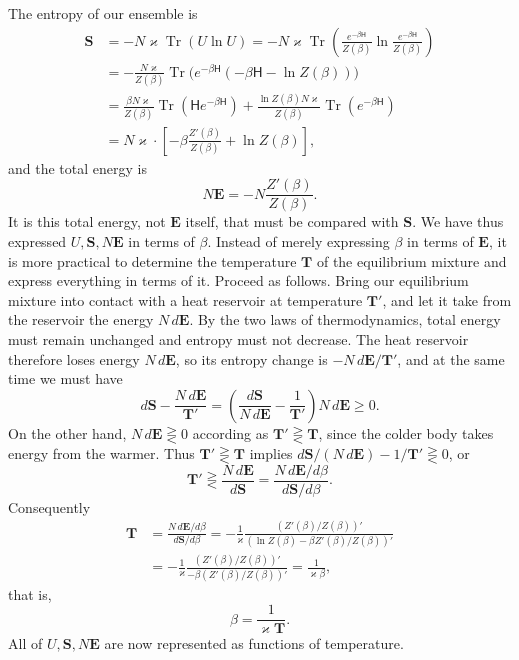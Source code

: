 \documentclass[fontsize=13pt,twoside,openany,headings=normal,parskip=false,bookmarkpackage=false,DIV=calc]{scrbook}
\begin{document}
The entropy of our ensemble is
\begin{align*}
\mathbf S&=-N\varkappa\operatorname{Tr}(U\ln U)
=-N\varkappa\operatorname{Tr}\left(\frac{e^{-\beta \mathsf{H}}}{Z(\beta)}\ln\frac{e^{-\beta \mathsf{H}}}{Z(\beta)}\right)\\
&=-\frac{N\varkappa}{Z(\beta)}\operatorname{Tr}\bigl(e^{-\beta \mathsf{H}}(-\beta \mathsf{H}-\ln Z(\beta))\bigr)\\
&=\frac{\beta N\varkappa}{Z(\beta)}\operatorname{Tr}(\mathsf{H}e^{-\beta \mathsf{H}})
+\frac{\ln Z(\beta)N\varkappa}{Z(\beta)}\operatorname{Tr}(e^{-\beta \mathsf{H}})\\
&=N\varkappa\cdot\left[-\beta\frac{Z'(\beta)}{Z(\beta)}+\ln Z(\beta)\right],
\end{align*}
\hypertarget{origpage-210}{}%
and the total energy is
\[
N\mathbf E=-N\frac{Z'(\beta)}{Z(\beta)}.
\]
It is this total energy, not $\mathbf E$ itself, that must be compared with $\mathbf S$. We have thus expressed $U,\mathbf S,N\mathbf E$ in terms of $\beta$. Instead of merely expressing $\beta$ in terms of $\mathbf E$, it is more practical to determine the temperature $\mathbf T$ of the equilibrium mixture and express everything in terms of it. Proceed as follows. Bring our equilibrium mixture into contact with a heat reservoir at temperature $\mathbf T'$, and let it take from the reservoir the energy $N\,d\mathbf E$. By the two laws of thermodynamics, total energy must remain unchanged and entropy must not decrease. The heat reservoir therefore loses energy $N\,d\mathbf E$, so its entropy change is $-N\,d\mathbf E/\mathbf T'$, and at the same time we must have
\[
d\mathbf S-\frac{N\,d\mathbf E}{\mathbf T'}
=\left(\frac{d\mathbf S}{N\,d\mathbf E}-\frac1{\mathbf T'}\right)N\,d\mathbf E\geq0.
\]
On the other hand, $N\,d\mathbf E\gtreqless0$ according as $\mathbf T'\gtreqless\mathbf T$, since the colder body takes energy from the warmer. Thus $\mathbf T'\gtreqless\mathbf T$ implies $d\mathbf S/(N\,d\mathbf E)-1/\mathbf T'\gtreqless0$, or
\[
\mathbf T'\gtreqless\frac{N\,d\mathbf E}{d\mathbf S}
=\frac{N\,d\mathbf E/d\beta}{d\mathbf S/d\beta}.
\]
Consequently
\begin{align*}
\mathbf T&=\frac{N\,d\mathbf E/d\beta}{d\mathbf S/d\beta}
=-\frac1\varkappa\frac{(Z'(\beta)/Z(\beta))'}{(\ln Z(\beta)-\beta Z'(\beta)/Z(\beta))'}\\
&=-\frac1\varkappa\frac{(Z'(\beta)/Z(\beta))'}{-\beta(Z'(\beta)/Z(\beta))'}
=\frac1{\varkappa\beta},
\end{align*}
that is,
\[
\beta=\frac1{\varkappa\mathbf T}.
\]
All of $U,\mathbf S,N\mathbf E$ are now represented as functions of temperature.
\end{document}
